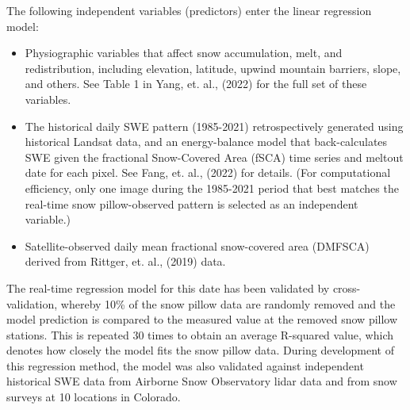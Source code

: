 \documentclass{article}
\begin{document}
\noindent The following independent variables (predictors) enter the linear regression model:
\begin{itemize}[label=-]
    \item Physiographic variables that affect snow accumulation, melt, and redistribution, including elevation, latitude, upwind mountain barriers, slope, and others. See Table 1 in Yang, et. al., (2022) for the full set of these variables.
    \item The historical daily SWE pattern (1985-2021) retrospectively generated using historical Landsat data, and an energy-balance model that back-calculates SWE given the fractional Snow-Covered Area (fSCA) time series and meltout date for each pixel. See Fang, et. al., (2022) for details. (For computational efficiency, only one image during the 1985-2021 period that best matches the real-time snow pillow-observed pattern is selected as an independent variable.)
    \item Satellite-observed daily mean fractional snow-covered area (DMFSCA) derived from Rittger, et. al., (2019) data.
\end{itemize}

\noindent The real-time regression model for this date has been validated by cross-validation, whereby 10\% of the snow pillow data are randomly removed and the model prediction is compared to the measured value at the removed snow pillow stations. This is repeated 30 times to obtain an average R-squared value, which denotes how closely the model fits the snow pillow data. During development of this regression method, the model was also validated against independent historical SWE data from Airborne Snow Observatory lidar data and from snow surveys at 10 locations in Colorado.\\
\end{document}

